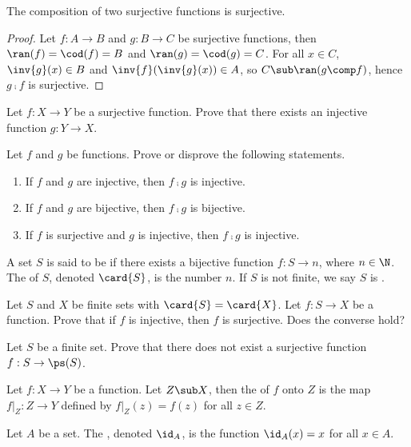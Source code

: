 \documentclass[10pt]{article}
\begin{document}
\begin{proposition}
    The composition of two surjective functions is surjective.
\end{proposition}
\begin{proof}
    Let $f:A\to B$ and $g:B\to C$ be surjective functions, then $\ran(f)=\cod(f)=B$ and $\ran(g)=\cod(g)=C$. For all $x\in C$, $\inv{g}(x)\in B$ and $\inv{f}(\inv{g}(x))\in A$, so $C\sub\ran(g\comp f)$, hence $g\comp f$ is surjective.
\end{proof}
\begin{problem}
    Let $f:X\to Y$ be a surjective function. Prove that there exists an injective function $g:Y\to X$.
\end{problem}
\begin{problem}
    Let $f$ and $g$ be functions. Prove or disprove the following statements.
    \begin{enumerate}
        \item If $f$ and $g$ are injective, then $f\comp g$ is injective. 
        \item If $f$ and $g$ are bijective, then $f\comp g$ is bijective.
        \item If $f$ is surjective and $g$ is injective, then $f\comp g$ is injective.
    \end{enumerate}
\end{problem}
\begin{definition}
    A set $S$ is said to be  if there exists a bijective function $f:S\to n$, where $n\in\N$. The  of $S$, denoted $\card{S}$, is the number $n$. If $S$ is not finite, we say $S$ is .
\end{definition}
\begin{problem}
    Let $S$ and $X$ be finite sets with $\card{S}=\card{X}$. Let $f:S\to X$ be a function. Prove that if $f$ is injective, then $f$ is surjective. Does the converse hold?
\end{problem}
\begin{problem}
    Let $S$ be a finite set. Prove that there does not exist a surjective function $f:S\to\ps(S)$. 
\end{problem}
\begin{definition}
    Let $f:X\to Y$ be a function. Let $Z\sub X$, then the  of $f$ onto $Z$ is the map $f{\vert}_{Z}:Z\to Y$ defined by $f{\vert}_{Z}(z)=f(z)$ for all $z\in Z$.
\end{definition}
\begin{definition}
    Let $A$ be a set. The , denoted ${\id}_{A}$, is the function ${\id}_{A}(x)=x$ for all $x\in A$.
\end{definition}
\end{document}
